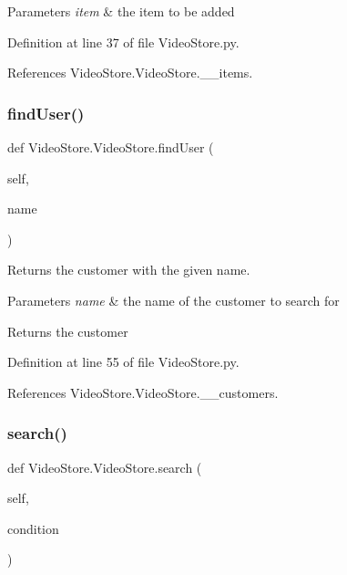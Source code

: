 \begin{DoxyParams}{Parameters}
{\em item} & the item to be added \\
\hline
\end{DoxyParams}


Definition at line 37 of file Video\+Store.\+py.



References Video\+Store.\+Video\+Store.\+\_\+\+\_\+items.

\mbox{\label{classVideoStore_1_1VideoStore_a864a5c88322cc7fe8d469963af6fbb74}} 
\subsubsection{\texorpdfstring{find\+User()}{findUser()}}
{\footnotesize\ttfamily def Video\+Store.\+Video\+Store.\+find\+User (\begin{DoxyParamCaption}\item[{}]{self,  }\item[{}]{name }\end{DoxyParamCaption})}



Returns the customer with the given name. 


\begin{DoxyParams}{Parameters}
{\em name} & the name of the customer to search for \\
\hline
\end{DoxyParams}
\begin{DoxyReturn}{Returns}
the customer 
\end{DoxyReturn}


Definition at line 55 of file Video\+Store.\+py.



References Video\+Store.\+Video\+Store.\+\_\+\+\_\+customers.

\mbox{\label{classVideoStore_1_1VideoStore_a29c4c5fb82ee840192af398692d41cf3}} 
\subsubsection{\texorpdfstring{search()}{search()}}
{\footnotesize\ttfamily def Video\+Store.\+Video\+Store.\+search (\begin{DoxyParamCaption}\item[{}]{self,  }\item[{}]{condition }\end{DoxyParamCaption})}



